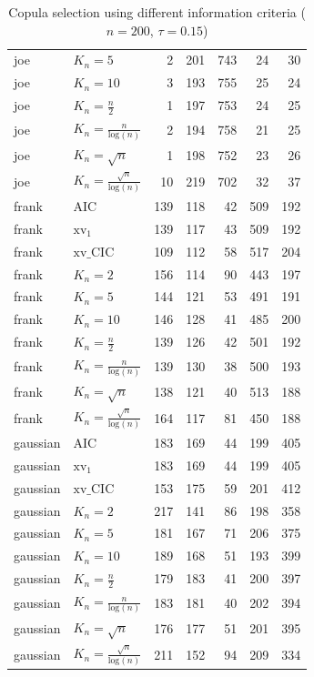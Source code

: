 \begin{table}[htbp]
\begin{tabular}{llrrrrr}
  joe & $K_{n}=5$ & 2 & 201 & 743 & 24 & 30 \\ 
  joe & $K_{n}=10$ & 3 & 193 & 755 & 25 & 24 \\ 
  joe & $K_{n}=\tfrac{n}{2}$ & 1 & 197 & 753 & 24 & 25 \\ 
  joe & $K_{n}=\tfrac{n}{\text{log}(n)}$ & 2 & 194 & 758 & 21 & 25 \\ 
  joe & $K_{n}=\sqrt{n}$ & 1 & 198 & 752 & 23 & 26 \\ 
  joe & $K_{n}=\tfrac{\sqrt{n}}{\text{log}(n)}$ & 10 & 219 & 702 & 32 & 37 \\ 
   \hdashline
frank & AIC & 139 & 118 & 42 & 509 & 192 \\ 
  frank & $\text{xv}_{1}$ & 139 & 117 & 43 & 509 & 192 \\ 
  frank & $\text{xv}\_\text{CIC}$ & 109 & 112 & 58 & 517 & 204 \\ 
  frank & $K_{n}=2$ & 156 & 114 & 90 & 443 & 197 \\ 
  frank & $K_{n}=5$ & 144 & 121 & 53 & 491 & 191 \\ 
  frank & $K_{n}=10$ & 146 & 128 & 41 & 485 & 200 \\ 
  frank & $K_{n}=\tfrac{n}{2}$ & 139 & 126 & 42 & 501 & 192 \\ 
  frank & $K_{n}=\tfrac{n}{\text{log}(n)}$ & 139 & 130 & 38 & 500 & 193 \\ 
  frank & $K_{n}=\sqrt{n}$ & 138 & 121 & 40 & 513 & 188 \\ 
  frank & $K_{n}=\tfrac{\sqrt{n}}{\text{log}(n)}$ & 164 & 117 & 81 & 450 & 188 \\ 
   \hdashline
gaussian & AIC & 183 & 169 & 44 & 199 & 405 \\ 
  gaussian & $\text{xv}_{1}$ & 183 & 169 & 44 & 199 & 405 \\ 
  gaussian & $\text{xv}\_\text{CIC}$ & 153 & 175 & 59 & 201 & 412 \\ 
  gaussian & $K_{n}=2$ & 217 & 141 & 86 & 198 & 358 \\ 
  gaussian & $K_{n}=5$ & 181 & 167 & 71 & 206 & 375 \\ 
  gaussian & $K_{n}=10$ & 189 & 168 & 51 & 193 & 399 \\ 
  gaussian & $K_{n}=\tfrac{n}{2}$ & 179 & 183 & 41 & 200 & 397 \\ 
  gaussian & $K_{n}=\tfrac{n}{\text{log}(n)}$ & 183 & 181 & 40 & 202 & 394 \\ 
  gaussian & $K_{n}=\sqrt{n}$ & 176 & 177 & 51 & 201 & 395 \\ 
  gaussian & $K_{n}=\tfrac{\sqrt{n}}{\text{log}(n)}$ & 211 & 152 & 94 & 209 & 334 \\ 
   \hline
\end{tabular}
\caption{Copula selection using different information criteria ($n = 200$, $\tau = 0.15$)} 
\end{table}



